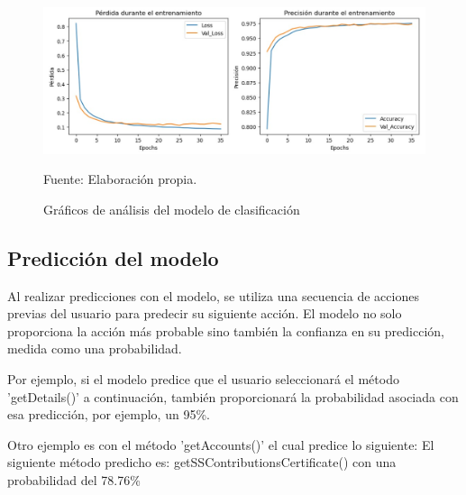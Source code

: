 \begin{figure}[H]
    \begin{minipage}[t]{0.9\textwidth}
        \caption{Gráficos de análisis del modelo de clasificación}
        \label{gráfico_clasificación}        
    \end{minipage}

    \vspace{10pt}

    \begin{minipage}[b]{1\textwidth}
        \centering
        \includegraphics[width=\textwidth]{img/Gráfico modelo clasificación.jpg}        
    \end{minipage}

    \begin{minipage}[t]{0.9\textwidth}
        Fuente: Elaboración propia.
    \end{minipage}
\end{figure}

\subsection{Predicción del modelo}

Al realizar predicciones con el modelo, se utiliza una secuencia de acciones previas del usuario para predecir su siguiente acción. El modelo no solo proporciona la acción más probable sino también la confianza en su predicción, medida como una probabilidad.

Por ejemplo, si el modelo predice que el usuario seleccionará el método 'getDetails()' a continuación, también proporcionará la probabilidad asociada con esa predicción, por ejemplo, un 95\%. 

Otro ejemplo es con el método 'getAccounts()' el cual predice lo siguiente: El siguiente método predicho es: getSSContributionsCertificate() con una probabilidad del 78.76\%